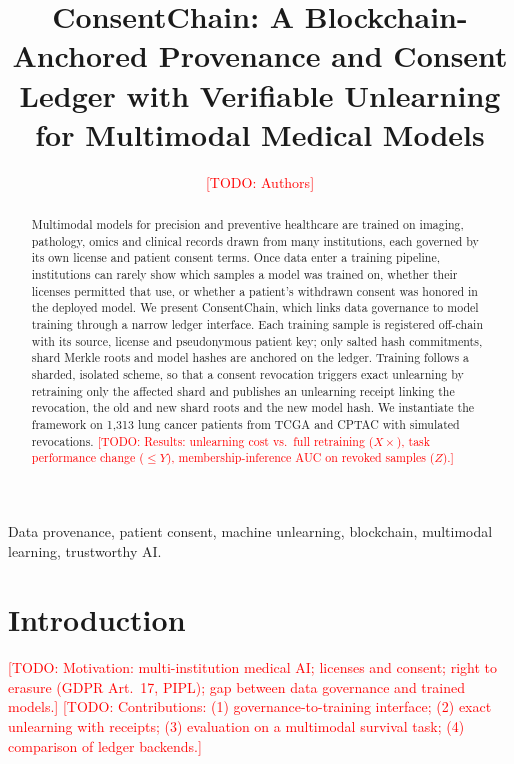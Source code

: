 \documentclass[journal,twoside,web]{IEEEtran}
\newcommand{\todo}[1]{\textcolor{red}{[TODO: #1]}}
\newcommand{\chain}[1]{\par\noindent\fcolorbox{blue}{blue!5}{\parbox{0.95\columnwidth}{\small\textcolor{blue}{[BLOCKCHAIN] #1}}}\par}
\begin{document}
\title{ConsentChain: A Blockchain-Anchored Provenance and Consent Ledger with Verifiable Unlearning for Multimodal Medical Models}
\author{\todo{Authors}}
\maketitle

\begin{abstract}
Multimodal models for precision and preventive healthcare are trained on imaging, pathology, omics and clinical records drawn from many institutions, each governed by its own license and patient consent terms. Once data enter a training pipeline, institutions can rarely show which samples a model was trained on, whether their licenses permitted that use, or whether a patient's withdrawn consent was honored in the deployed model. We present ConsentChain, which links data governance to model training through a narrow ledger interface. Each training sample is registered off-chain with its source, license and pseudonymous patient key; only salted hash commitments, shard Merkle roots and model hashes are anchored on the ledger. Training follows a sharded, isolated scheme, so that a consent revocation triggers exact unlearning by retraining only the affected shard and publishes an unlearning receipt linking the revocation, the old and new shard roots and the new model hash. We instantiate the framework on 1,313 lung cancer patients from TCGA and CPTAC with simulated revocations. \todo{Results: unlearning cost vs.\ full retraining ($X\times$), task performance change ($\le Y$), membership-inference AUC on revoked samples ($Z$).} \chain{Ledger overhead on a permissioned blockchain vs.\ a centralized hash-chained log: latency $W$\,s per event, throughput, tamper resistance.}
\end{abstract}

\begin{IEEEkeywords}
Data provenance, patient consent, machine unlearning, blockchain, multimodal learning, trustworthy AI.
\end{IEEEkeywords}

\section{Introduction}
\todo{Motivation: multi-institution medical AI; licenses and consent; right to erasure (GDPR Art.\ 17, PIPL); gap between data governance and trained models.}
\todo{Contributions: (1) governance-to-training interface; (2) exact unlearning with receipts; (3) evaluation on a multimodal survival task; (4) comparison of ledger backends.}
\end{document}
